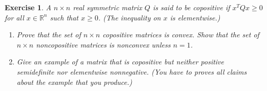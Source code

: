 \documentclass[12pt]{article}
\theoremstyle{colon}
\newtheorem{exercise}{Exercise}
\begin{document}
\clearpage

\begin{exercise}
  A $n \times n$ real symmetric matrix $Q$ is said to be \textit{copositive} if $x^T Q x \geq 0$ for all $x \in \mathbb{R}^n$ such that $x \geq 0$. (The inequality on $x$ is elementwise.)
  \begin{enumerate}[label=\alph*)]
    \item Prove that the set of $n \times n$ copositive matrices is convex. Show that the set of $n \times n$ noncopositive matrices is nonconvex unless $n = 1$.
    \item Give an example of a matrix that is copositive but neither positive semidefinite nor elementwise nonnegative. (You have to proves all claims about the example that you produce.)
  \end{enumerate}
\end{exercise}
\end{document}
